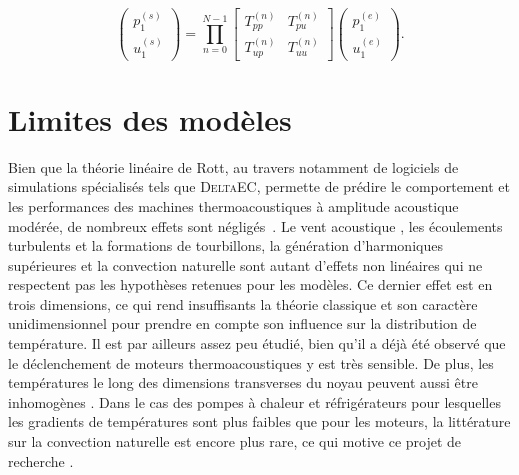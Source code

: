 \begin{equation}
\begin{pmatrix}
p_1^{(s)}\\
u_1^{(s)}
\end{pmatrix} = \prod_{n=0}^{N-1} \begin{bmatrix}
T_{pp}^{(n)} & T_{pu}^{(n)}\\
T_{up}^{(n)} & T_{uu}^{(n)}
\end{bmatrix}\begin{pmatrix}
p_1^{(e)}\\
u_1^{(e)}
\end{pmatrix}.
\label{eq:TMatrix_prod_TppTuu}
\end{equation}

\section{Limites des modèles}


Bien que la théorie linéaire de Rott, au travers notamment de logiciels de simulations spécialisés tels que \textsc{DeltaEC}, permette de prédire le comportement et les performances des machines thermoacoustiques à amplitude acoustique modérée, de nombreux effets sont négligés~\cite{DeltaEC}. Le vent acoustique \cite{so_internal_2006, bailliet_acoustic_2001, ramadan_experimental_2018}, les écoulements turbulents et la formations de tourbillons, la génération d'harmoniques supérieures et la convection naturelle sont autant d'effets non linéaires qui ne respectent pas les hypothèses retenues pour les modèles. Ce dernier effet est en trois dimensions, ce qui rend insuffisants la théorie classique et son caractère unidimensionnel pour prendre en compte son influence sur la distribution de température. Il est par ailleurs assez peu étudié, bien qu'il a déjà été observé que le déclenchement de moteurs thermoacoustiques y est très sensible. De plus, les températures le long des dimensions transverses du noyau peuvent aussi être inhomogènes \cite{ross_influence_2003, ramadan_experimental_2018, hireche_numerical_2019}. Dans le cas des pompes à chaleur et réfrigérateurs pour lesquelles les gradients de températures sont plus faibles que pour les moteurs, la littérature sur la convection naturelle est encore plus rare, ce qui motive ce projet de recherche \cite{zhang_novel_2011, babaei_investigation_2010}.


